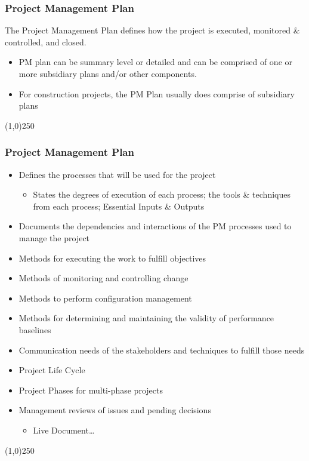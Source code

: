 \begin{frame}
\frametitle{Project Management Plan}
The Project Management Plan defines how the project is executed, monitored \& controlled, and closed.  
\begin{itemize}
	\item PM plan can be summary level or detailed and can be comprised of one or more subsidiary plans and/or other components.
	\item For construction projects, the PM Plan usually does comprise of subsidiary plans
\end{itemize}	
	
\end{frame}\begin{center}\line(1,0){250}\end{center}
%
%


\begin{frame}
\frametitle{Project Management Plan}
\begin{itemize}
	\item Defines the processes that will be used for the project
		\begin{itemize}
			\item States the degrees of execution of each process; the tools \& techniques from each process; Essential Inputs \& Outputs
		\end{itemize}
	\item Documents the dependencies and interactions of the PM processes used to manage the project
	\item Methods for executing the work to fulfill objectives
	\item Methods of monitoring and controlling change
	\item Methods to perform configuration management
	\item Methods for determining and maintaining the validity of performance baselines
	\item Communication needs of the stakeholders and techniques to fulfill those needs
	\item Project Life Cycle
	\item Project Phases for multi-phase projects
	\item Management reviews of issues and pending decisions
		\begin{itemize}
			\item Live Document\ldots
		\end{itemize}
\end{itemize}
\end{frame}\begin{center}\line(1,0){250}\end{center}
%
%


